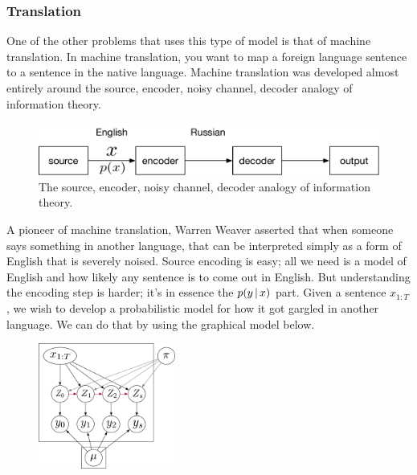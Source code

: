 \documentclass{article}
\begin{document}
\subsubsection{Translation}

One of the other problems that uses this type of model is that of machine translation. In machine translation, you want to map a foreign language sentence to a sentence in the native language. Machine translation was developed almost entirely around the source, encoder, noisy channel, decoder analogy of information theory.

\begin{figure}[h]
    \centering
    \includegraphics[width=1.0\textwidth]{figs/encoder_translation.pdf}
    \caption{The source, encoder, noisy channel, decoder analogy of information theory.}
    \label{fig:sedo}
\end{figure}

A pioneer of machine translation, Warren Weaver asserted that when someone says something in another language, that can be interpreted simply as a form of English that is severely noised. Source encoding is easy; all we need is a model of English and how likely any sentence is to come out in English. But understanding the encoding step is harder; it's in essence the $p(y \,|\, x)$ part. Given a sentence $x_{1:T}$, we wish to develop a probabilistic model for how it got gargled in another language. We can do that by using the graphical model below.\\

\begin{figure}[h]
    \centering
    \includegraphics[width=0.40\textwidth]{figs/mt_dgm.pdf}
    \caption{}
    \label{fig:mt_dgm}
\end{figure}
\end{document}
